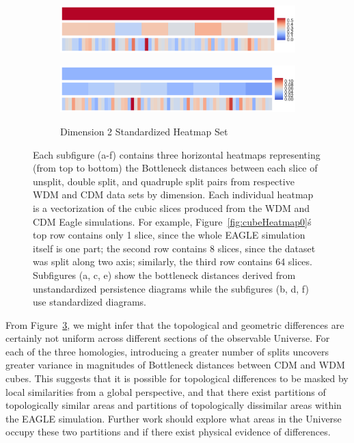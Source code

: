\documentclass[12pt]{article}
\newcommand{\figref}[1]{Figure~\ref{#1}}
\begin{document}
\begin{figure}[htp!]
\begin{subfigure}{.45\textwidth}
    \includegraphics[width=\linewidth]{fig_12_hmap_dim2_nonorm.pdf}
    \label{fig:cubeHeatmap2}
  \end{subfigure}
  \begin{subfigure}{.45\textwidth}
    \centering
    \caption{Dimension 2 Standardized Heatmap Set}
    \includegraphics[width=\linewidth]{fig_12_hmap_dim2_yesnorm.pdf}
    \label{fig:cubeHeatmapStand2}
  \end{subfigure}
  \caption{Each subfigure (a-f) contains three horizontal heatmaps representing (from top to bottom) the Bottleneck distances between each slice of unsplit, double split, and quadruple split pairs from respective WDM and CDM data sets by dimension. Each individual heatmap is a vectorization of the cubic slices produced from the WDM and CDM Eagle simulations. For example, \figref{fig:cubeHeatmap0}\'s top row contains only 1 slice, since the whole EAGLE simulation itself is one part; the second row contains 8 slices, since the dataset was split along two axis; similarly, the third row contains 64 slices. Subfigures (a, c, e) show the bottleneck distances derived from unstandardized persistence diagrams while the subfigures (b, d, f) use standardized diagrams.}
  \label{fig:cubeHeatmap}
\end{figure}

From \figref{fig:cubeHeatmap}, we might infer that the topological and geometric differences are certainly not uniform across different sections of the observable Universe. For each of the three homologies, introducing a greater number of splits uncovers greater variance in magnitudes of Bottleneck distances between CDM and WDM cubes. This suggests that it is possible for topological differences to be masked by local similarities from a global perspective, and that there exist partitions of topologically similar areas and partitions of topologically dissimilar areas within the EAGLE simulation. Further work should explore what areas in the Universe occupy these two partitions and if there exist physical evidence of differences.
\end{document}
